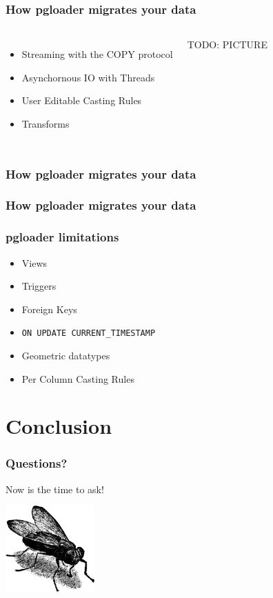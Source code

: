 \documentclass{beamer}
\begin{document}
\begin{frame}[fragile]
  \frametitle{How pgloader migrates your data}
  
  \vfill

\begin{columns}

  \begin{itemize}
  \item Streaming with the COPY protocol
  \item Asynchornous IO with Threads
  \item User Editable Casting Rules
  \item Transforms
  \end{itemize}  

\begin{center}
  TODO: PICTURE
\end{center}
\end{columns}
\end{frame}

\begin{frame}[fragile]
  \frametitle{How pgloader migrates your data}
  
\end{frame}

\begin{frame}[fragile]
  \frametitle{How pgloader migrates your data}
  
\end{frame}

\begin{frame}[fragile]
  \frametitle{pgloader limitations}
  
  \vfill

  \begin{itemize}
  \item Views
  \item Triggers
  \item Foreign Keys
  \item \texttt{ON UPDATE CURRENT\_TIMESTAMP}
  \item Geometric datatypes
  \item Per Column Casting Rules
  \end{itemize}
\end{frame}

\section{Conclusion}

\begin{frame}
  \frametitle{Questions?}

\begin{center}
  Now is the time to ask!
  \vfill

  \includegraphics[height=9em]{fly.png}
\end{center}
\end{frame}
\end{document}
